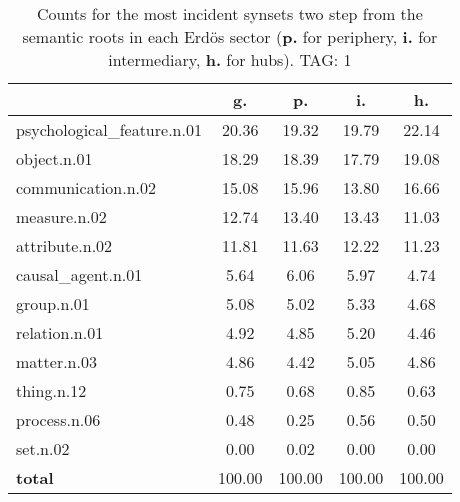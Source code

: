 \begin{table}[h!]
\begin{center}
\begin{tabular}{| l || c | c | c | c |}\hline
 & {\bf g.} & {\bf p.} & {\bf i.} & {\bf h.} \\\hline\hline
psychological\_feature.n.01 & 20.36  & 19.32  & 19.79  & 22.14 \\\hline
object.n.01 & 18.29  & 18.39  & 17.79  & 19.08 \\\hline
communication.n.02 & 15.08  & 15.96  & 13.80  & 16.66 \\\hline
measure.n.02 & 12.74  & 13.40  & 13.43  & 11.03 \\\hline
attribute.n.02 & 11.81  & 11.63  & 12.22  & 11.23 \\\hline
causal\_agent.n.01 & 5.64  & 6.06  & 5.97  & 4.74 \\\hline
group.n.01 & 5.08  & 5.02  & 5.33  & 4.68 \\\hline
relation.n.01 & 4.92  & 4.85  & 5.20  & 4.46 \\\hline
matter.n.03 & 4.86  & 4.42  & 5.05  & 4.86 \\\hline
thing.n.12 & 0.75  & 0.68  & 0.85  & 0.63 \\\hline
process.n.06 & 0.48  & 0.25  & 0.56  & 0.50 \\\hline
set.n.02 & 0.00  & 0.02  & 0.00  & 0.00 \\\hline\hline
{{\bf total}} & 100.00  & 100.00  & 100.00  & 100.00 \\\hline
\end{tabular}
\caption{Counts for the most incident synsets two step from the semantic roots in each Erd\"os sector ({\bf p.} for periphery, {\bf i.} for intermediary, {\bf h.} for hubs). TAG: 1}
\end{center}
\end{table}